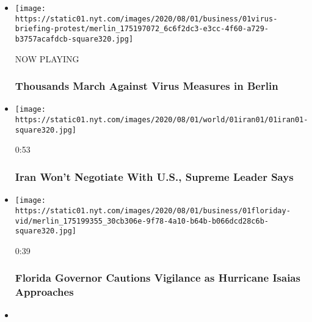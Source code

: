 \begin{itemize}
\item
  \texttt{[image: https://static01.nyt.com/images/2020/08/01/business/01virus-briefing-protest/merlin\_175197072\_6c6f2dc3-e3cc-4f60-a729-b3757acafdcb-square320.jpg]}

  NOW PLAYING

  \hypertarget{thousands-march-against-virus-measures-in-berlin-1}{%
  \subsubsection{Thousands March Against Virus Measures in
  Berlin}\label{thousands-march-against-virus-measures-in-berlin-1}}
\item
  \href{https://www.nytimes.com/video/world/middleeast/100000007268443/iran-united-states-nuclear-program-negotiation.html?action=click\&module=video-series-bar\&region=header\&pgtype=Article\&playlistId=video/latest-video}{}

  \texttt{[image: https://static01.nyt.com/images/2020/08/01/world/01iran01/01iran01-square320.jpg]}

  0:53

  \hypertarget{iran-wont-negotiate-with-us-supreme-leader-says}{%
  \subsubsection{Iran Won't Negotiate With U.S., Supreme Leader
  Says}\label{iran-wont-negotiate-with-us-supreme-leader-says}}
\item
  \href{https://www.nytimes.com/video/us/100000007268424/desantis-florida-hurricane-isaias.html?action=click\&module=video-series-bar\&region=header\&pgtype=Article\&playlistId=video/latest-video}{}

  \texttt{[image: https://static01.nyt.com/images/2020/08/01/business/01floriday-vid/merlin\_175199355\_30cb306e-9f78-4a10-b64b-b066dcd28c6b-square320.jpg]}

  0:39

  \hypertarget{florida-governor-cautions-vigilance-as-hurricane-isaias-approaches}{%
  \subsubsection{Florida Governor Cautions Vigilance as Hurricane Isaias
  Approaches}\label{florida-governor-cautions-vigilance-as-hurricane-isaias-approaches}}
\item
  \href{https://www.nytimes.com/video/us/100000007267362/white-house-mail-in-ballots-election.html?action=click\&module=video-series-bar\&region=header\&pgtype=Article\&playlistId=video/latest-video}{}


\end{itemize}
